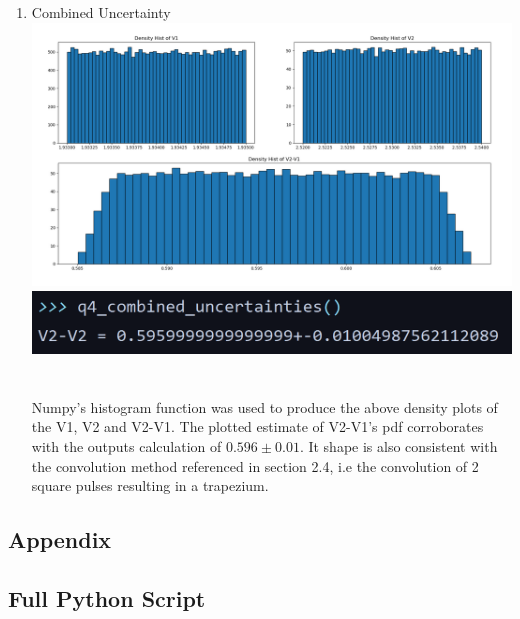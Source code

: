 \documentclass[11pt]{article}
\newcommand{\Newpage}{\end{preview}\begin{preview}}
\begin{document}
\begin{preview}
\begin{enumerate}
        \item Combined Uncertainty \\
        \includegraphics[width=\linewidth]{inc/q4_plot.png} \\
        \includegraphics[width=\linewidth]{inc/q4_out.png} \\ \\ \\
        Numpy's histogram function was used to produce the above density plots of the V1, V2 and V2-V1. The plotted estimate of V2-V1's pdf corroborates with the outputs calculation of $0.596\pm0.01$. It shape is also consistent with the convolution method referenced in section 2.4, \tiny{i.e the convolution of 2 square pulses resulting in a trapezium.}
\end{enumerate}

\Newpage
\section*{Appendix}
\subsection*{Full Python Script}

\end{preview}
\end{document}
